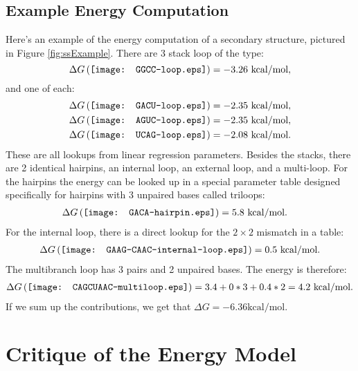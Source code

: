 \subsection{Example Energy Computation}

Here's an example of the energy computation of a secondary structure,
pictured in Figure \ref{fig:ssExample}. There are 3 stack loop of the type:
\begin{equation}
  \Delta G \left ( \vcenter{\hbox{\texttt{[image: GGCC-loop.eps]}}}
  \right ) = -3.26 \text{ kcal/mol},
\end{equation}
and one of each:
\begin{align}
  &\Delta G \left ( \vcenter{\hbox{\texttt{[image: GACU-loop.eps]}}}
  \right ) = -2.35 \text{ kcal/mol},\\ 
  &\Delta G \left ( \vcenter{\hbox{\texttt{[image: AGUC-loop.eps]}}}
  \right ) = -2.35 \text{ kcal/mol},\\
  &\Delta G \left ( \vcenter{\hbox{\texttt{[image: UCAG-loop.eps]}}}
  \right ) = -2.08 \text{ kcal/mol}.
\end{align}
These are all lookups from linear regression parameters. Besides the
stacks, there are 2 identical hairpins, an internal loop, an external
loop, and a multi-loop. For the hairpins the energy can be looked up
in a special parameter table designed specifically for hairpins with 3
unpaired bases called triloops:
\begin{align}
  \Delta G \left ( \vcenter{\hbox{\texttt{[image: GACA-hairpin.eps]}}}
  \right ) &= 5.8 \text{ kcal/mol}.
\end{align}
For the internal loop, there is a direct lookup for the $2 \times 2$
mismatch in a table:
\begin{align}
  \Delta G \left ( \vcenter{\hbox{\texttt{[image: GAAG-CAAC-internal-loop.eps]}}}
  \right ) = 0.5 \text{ kcal/mol}.
\end{align}
The multibranch loop has 3 pairs and 2 unpaired bases. The energy is therefore:
\begin{align}
  \Delta G \left (\vcenter{\hbox{\texttt{[image: CAGCUAAC-multiloop.eps]}}}
  \right ) = 3.4 + 0*3 + 0.4*2 = 4.2 \text{ kcal/mol}.
\end{align}
If we sum up the contributions, we get that $\Delta G = -6.36 \text{
  kcal/mol}$. 
\section{Critique of the Energy Model}

